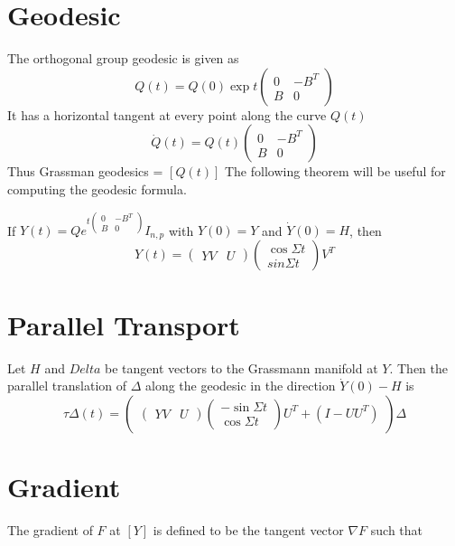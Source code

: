 \documentclass[11pt,a4paper]{report}
\begin{document}
\section{Geodesic}
The orthogonal group geodesic is given as
$$Q(t) = Q(0) \exp t \begin{pmatrix} 0 & -B^T \\ B & 0 \end{pmatrix} $$
It has a horizontal tangent at every point along the curve $Q(t)$
$$ \dot{Q}(t) = Q(t) \begin{pmatrix} 0 & -B^T \\ B & 0 \end{pmatrix}$$
Thus Grassman geodesics = $ [ Q(t) ] $
The following theorem will be useful for computing the geodesic formula.
\begin{thm}
    If $Y(t) = Q e^{t \begin{pmatrix} 0 & -B^T \\ B & 0 \end{pmatrix} } I_{n,p} $ with $Y(0) = Y$ and $\dot{Y}(0) = H$, then
    $$ Y(t) = \begin{pmatrix} YV & U \end{pmatrix} \begin{pmatrix} \cos \Sigma t \\ sin \Sigma t \end{pmatrix} V^T $$
\end{thm}

\section{Parallel Transport}
\begin{thm}
    Let $H$ and $Delta$ be tangent vectors to the Grassmann manifold at $Y$.
    Then the parallel translation of $\Delta$ along the geodesic in the direction $\dot{Y}(0) - H$ is
    $$ \tau \Delta(t) = \begin{pmatrix} \begin{pmatrix} YV & U \end{pmatrix} \begin{pmatrix} -\sin \Sigma t \\ \cos \Sigma t \end{pmatrix} U^T + (I - UU^T) \end{pmatrix} \Delta $$
\end{thm}
\section{Gradient}
The gradient of $F$ at $[Y]$ is defined to be the tangent vector $\nabla F$ such that
\end{document}
